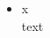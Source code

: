 \begin{multicols}{2}


    \begin{itemize}

        \item[]x\\
        text

    \end{itemize}

\end{multicols}
